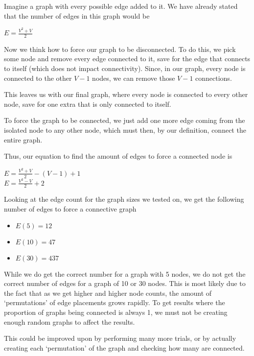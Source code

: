 \documentclass[12pt]{article}
\begin{document}
Imagine a graph with every possible edge added to it. We have already stated that the number of edges in this graph would be
\begin{center}
    $E = \frac{V^2 + V}{2}$
\end{center}

Now we think how to force our graph to be disconnected. To do this, we pick some node and remove every edge connected to it, save for the edge that connects to itself (which does not impact connectivity). Since, in our graph, every node is connected to the other $V-1$ nodes, we can remove those $V-1$ connections.

This leaves us with our final graph, where every node is connected to every other node, save for one extra that is only connected to itself.

To force the graph to be connected, we just add one more edge coming from the isolated node to any other node, which must then, by our definition, connect the entire graph.

Thus, our equation to find the amount of edges to force a connected node is
\begin{center}
    $E = \frac{V^2 + V}{2} - (V-1) + 1$\\
    $E = \frac{V^2 - V}{2} + 2$
\end{center}

Looking at the edge count for the graph sizes we tested on, we get the following number of edges to force a connective graph

\begin{itemize}
    \item $E(5) = 12$ 
    \item $E(10) = 47$ 
    \item $E(30) = 437$ 
\end{itemize}

While we do get the correct number for a graph with 5 nodes, we do not get the correct number of edges for a graph of 10 or 30 nodes. This is most likely due to the fact that as we get higher and higher node counts, the
amount of `permutations' of edge placements grows rapidly. To get results where the proportion of graphs being connected is always 1, we must not be creating enough random graphs to affect the results.

This could be improved upon by performing many more trials, or by actually creating each `permutation' of the graph and checking how many are connected.

%
%
%
%
\newpage
\end{document}
